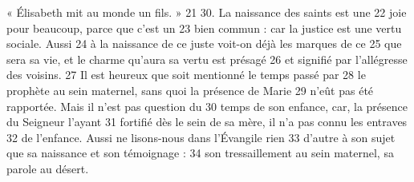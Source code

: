 « Élisabeth mit au monde un fils. »	 
21	 	30. La naissance des saints est une	 
22	 	joie pour beaucoup, parce que c'est un	 
23	 	bien commun : car la justice est une vertu sociale. Aussi	 
24	 	à la naissance de ce juste voit-on déjà les marques de ce	 
25	 	que sera sa vie, et le charme qu'aura sa vertu est présagé	 
26	 	et signifié par l'allégresse des voisins.	 
27	 	Il est heureux que soit mentionné le temps passé par	 
28	 	le prophète au sein maternel, sans quoi la présence de Marie	 
29	 	n'eût pas été rapportée. Mais il n'est pas question du	 
30	 	temps de son enfance, car, la présence du Seigneur l'ayant	 
31	 	fortifié dès le sein de sa mère, il n'a pas connu les entraves	 
32	 	de l'enfance. Aussi ne lisons-nous dans l'Évangile rien	 
33	 	d'autre à son sujet que sa naissance et son témoignage :	 
34	 	son tressaillement au sein maternel, sa parole au désert.
